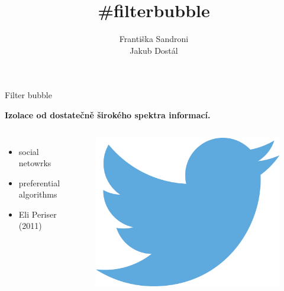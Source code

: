 \documentclass[notheorems,12pt]{beamer}
\title[]{\#filterbubble}
\date{}
\author{Františka Sandroni\\
        Jakub Dostál}
\institute{}
\begin{document}
\maketitle
\begin{frame}{Filter bubble}
    \center
    \vspace{-0.1cm}
    \begin{large}\textbf{Izolace od dostatečně širokého spektra informací.}\end{large}
    \vspace{0.8cm}
    \begin{columns}
    \column{5cm}
    \begin{itemize}
        \item social netowrks
        \item preferential algorithms
        \item Eli Periser (2011)
    \end{itemize}
    \column{6cm}
        \begin{figure}
            \centering
            \includegraphics[scale=0.4]{./Pics/twitter.png}
        \end{figure}
    \end{columns}
\end{frame}
\end{document}
